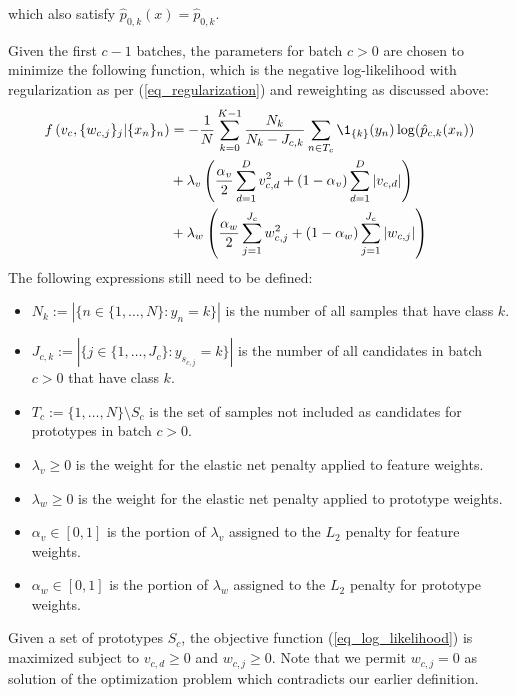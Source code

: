 %
which also satisfy $\hat{p}_{0,k}(x)=\hat{p}_{0,k}$.
%
\begin{center}\end{center}
%
Given the first $c-1$ batches, the parameters for batch $c>0$ are chosen to minimize the following function, which is the negative log-likelihood with regularization as per (\ref{eq_regularization}) and reweighting as discussed above:
%
\begin{align}
f\left(v_c,\{w_{c,j}\}_j|\{x_n\}_n\right)
&=-\frac{1}{N}\sum_{k=0}^{K-1}\frac{N_k}{N_k-J_{c,k}}\sum_{n\in T_c}
\1_{\{k\}}(y_n)\log(\hat{p}_{c,k}(x_n))\label{eq_log_likelihood}\\
&+\lambda_v\left(\frac{\alpha_v}{2}\sum_{d=1}^Dv_{c,d}^2
+(1-\alpha_v)\sum_{d=1}^D|v_{c,d}|\right)\notag\\
&+\lambda_w\left(\frac{\alpha_w}{2}\sum_{j=1}^{J_c}w_{c,j}^2
+(1-\alpha_w)\sum_{j=1}^{J_c}|w_{c,j}|\right)\notag
\end{align}
%
The following expressions still need to be defined:
%
\begin{itemize}
\item $N_k:=\left|\{n\in\{1,\dots,N\}:y_n=k\}\right|$ is the number of all samples that have class $k$.
%
\item $J_{c,k}:=\left|\{j\in\{1,\dots,J_c\}:y_{s_{c,j}}=k\}\right|$
is the number of all candidates in batch $c>0$ that have class $k$.
%
\item $T_c:=\{1,\dots,N\}\setminus S_c$ is the set of samples not included as candidates for prototypes in batch $c>0$.
%
\item $\lambda_v\geq0$ is the weight for the elastic net penalty applied to feature weights.
%
\item $\lambda_w\geq0$ is the weight for the elastic net penalty applied to prototype weights.
%
\item $\alpha_v\in[0,1]$ is the portion of $\lambda_v$ assigned to the $L_2$ penalty for feature weights.
%
\item $\alpha_w\in[0,1]$ is the portion of $\lambda_w$ assigned to the $L_2$ penalty for prototype weights.
\end{itemize}
%
Given a set of prototypes $S_c$, the objective function (\ref{eq_log_likelihood}) is maximized subject to $v_{c,d}\geq0$ and $w_{c,j}\geq0$.
Note that we permit $w_{c,j}=0$ as solution of the optimization problem which contradicts our earlier definition.
